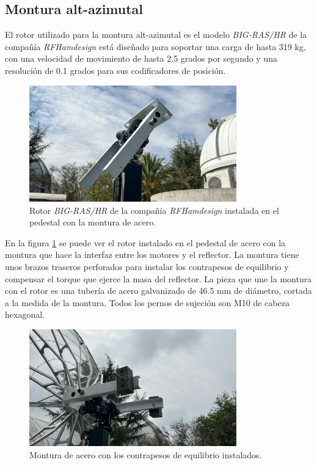 \subsection{Montura alt-azimutal}

El rotor utilizado para la montura alt-azimutal es el modelo \textit{BIG-RAS/HR} de la compañía \textit{RFHamdesign} \cite{spid_bigrashr} está diseñado para soportar una carga de hasta 319 kg, con una velocidad de movimiento de hasta 2.5 grados por segundo y una resolución de 0.1 grados para sus codificadores de posición.\\

\begin{figure}
    \centering
    \includegraphics[width=0.8\textwidth]{img/soporte_montura}
    \caption{Rotor \textit{BIG-RAS/HR} de la compañía \textit{RFHamdesign} instalada en el pedestal con la montura de acero.}
    \label{fig:ensamble10}
\end{figure}

En la figura \ref{fig:ensamble10} se puede ver el rotor instalado en el pedestal de acero con la montura que hace la interfaz entre los motores y el reflector. La montura tiene unos brazos traseros perforados para instalar los contrapesos de equilibrio y compensar el torque que ejerce la masa del reflector. La pieza que une la montura con el rotor es una tubería de acero galvanizado de 46.5 mm de diámetro, cortada a la medida de la montura. Todos los pernos de sujeción son M10 de cabeza hexagonal.\\

\begin{figure}
    \centering
    \includegraphics[width=0.8\textwidth]{img/contrapesos}
    \caption{Montura de acero con los contrapesos de equilibrio instalados.}
    \label{fig:ensamble11}
\end{figure}

